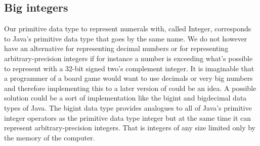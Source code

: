 \subsection{Big integers}
\label{sec:bigintegers}

Our primitive data type to represent numerals with, called Integer, corresponds to Java's primitive data type that goes by the same name. We do not however have an alternative for representing decimal numbers or for representing arbitrary-precision integers if for instance a number is exceeding what's possible to represent with a 32-bit signed two's complement integer. It is imaginable that a programmer of a board game would want to use decimals or very big numbers and therefore implementing this to a later version of \productname{} could be an idea. A possible solution could be a sort of implementation like the bigint and bigdecimal data types of Java. The bigint data type provides analogues to all of Java's primitive integer operators as the primitive data type integer \cite{javabigint} but at the same time it can represent arbitrary-precision integers. That is integers of any size limited only by the memory of the computer. 